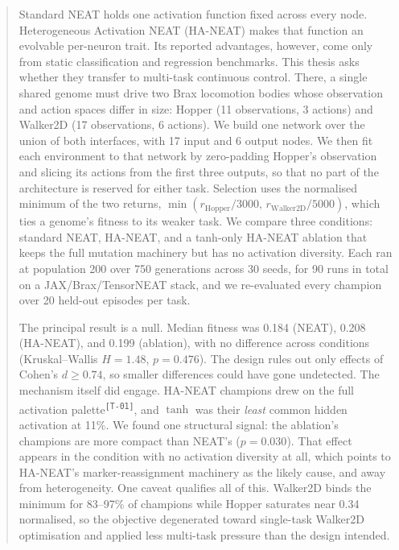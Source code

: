 \documentclass[12pt]{article}
\newcommand{\revID}[1]{\textsuperscript{\scriptsize\texttt{[#1]}}}
\newcommand{\revTerm}[2]{\textcolor{lrTeal}{#2}\revID{#1}}      %
\begin{document}
\begin{abstract}
\noindent
Standard NEAT holds one activation function fixed across every node. Heterogeneous Activation NEAT (HA-NEAT) makes that function an evolvable per-neuron trait. Its reported advantages, however, come only from static classification and regression benchmarks. This thesis asks whether they transfer to multi-task continuous control. There, a single shared genome must drive two Brax locomotion bodies whose observation and action spaces differ in size: Hopper (11 observations, 3 actions) and Walker2D (17 observations, 6 actions). We build one network over the union of both interfaces, with 17 input and 6 output nodes. We then fit each environment to that network by zero-padding Hopper's observation and slicing its actions from the first three outputs, so that no part of the architecture is reserved for either task. Selection uses the normalised minimum of the two returns, $\min(r_{\text{Hopper}}/3000,\, r_{\text{Walker2D}}/5000)$, which ties a genome's fitness to its weaker task. We compare three conditions: standard NEAT, HA-NEAT, and a tanh-only HA-NEAT ablation that keeps the full mutation machinery but has no activation diversity. Each ran at population 200 over 750 generations across 30 seeds, for 90 runs in total on a JAX/Brax/TensorNEAT stack, and we re-evaluated every champion over 20 held-out episodes per task.

The principal result is a null. Median fitness was 0.184 (NEAT), 0.208 (HA-NEAT), and 0.199 (ablation), with no difference across conditions (Kruskal--Wallis $H = 1.48$, $p = 0.476$). The design rules out only effects of Cohen's $d \geq 0.74$, so smaller differences could have gone undetected. The mechanism itself did engage. HA-NEAT champions drew on the \revTerm{T-01}{full activation palette}, and $\tanh$ was their \emph{least} common hidden activation at 11\%. We found one structural signal: the ablation's champions are more compact than NEAT's ($p = 0.030$). That effect appears in the condition with no activation diversity at all, which points to HA-NEAT's marker-reassignment machinery as the likely cause, and away from heterogeneity. One caveat qualifies all of this. Walker2D binds the minimum for 83--97\% of champions while Hopper saturates near 0.34 normalised, so the objective degenerated toward single-task Walker2D optimisation and applied less multi-task pressure than the design intended.
\end{abstract}

\newpage
\end{document}
